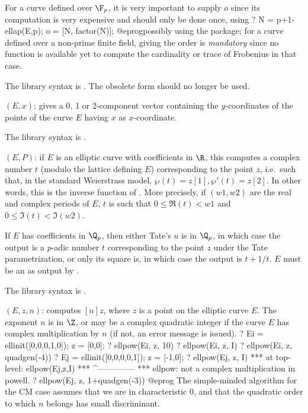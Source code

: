 For a curve defined over $\F_p$, it is very important to supply $o$ since
its computation is very expensive and should only be done once, using
\bprog
? N = p+1-ellap(E,p); o = [N, factor(N)];
@eprog\noindent possibly using the  package; for a curve defined
over a non-prime finite field,
giving the order is \emph{mandatory} since no function is available yet to
compute the cardinality or trace of Frobenius in that case.

The library syntax is .
The obsolete form  should no longer be
used.

$(E,x)$: \label{se:ellordinate}
gives a 0, 1 or 2-component vector containing
the $y$-coordinates of the points of the curve $E$ having $x$ as
$x$-coordinate.

The library syntax is .

$(E,P)$: \label{se:ellpointtoz}
if $E$ is an elliptic curve with coefficients
in $\R$, this computes a complex number $t$ (modulo the lattice defining
$E$) corresponding to the point $z$, i.e.~such that, in the standard
Weierstrass model, $\wp(t)=z[1],\wp'(t)=z[2]$. In other words, this is the
inverse function of . More precisely, if $(w1,w2)$ are the
real and complex periods of $E$, $t$ is such that $0 \leq \Re(t) < w1$
and $0 \leq \Im(t) < \Im(w2)$.

If $E$ has coefficients in $\Q_p$, then either Tate's $u$ is in $\Q_p$, in
which case the output is a $p$-adic number $t$ corresponding to the point $z$
under the Tate parametrization, or only its square is, in which case the
output is $t+1/t$. $E$ must be an  as output by .

The library syntax is .

$(E,z,n)$: \label{se:ellpow}
computes $[n]z$, where $z$ is a point on the elliptic curve $E$. The
exponent $n$ is in $\Z$, or may be a complex quadratic integer if the curve $E$
has complex multiplication by $n$ (if not, an error message is issued).
\bprog
? Ei = ellinit([0,0,0,1,0]); z = [0,0];
? ellpow(Ei, z, 10)
? ellpow(Ei, z, I)
? ellpow(Ei, z, quadgen(-4))
? Ej  = ellinit([0,0,0,0,1]); z = [-1,0];
? ellpow(Ej, z, I)
  ***   at top-level: ellpow(Ej,z,I)
  ***                 ^--------------
  *** ellpow: not a complex multiplication in powell.
? ellpow(Ej, z, 1+quadgen(-3))
@eprog
The simple-minded algorithm for the CM case assumes that we are in
characteristic $0$, and that the quadratic order to which $n$ belongs has
small discriminant.

